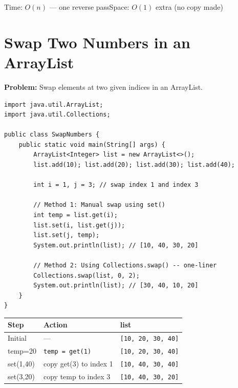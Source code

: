 \documentclass[12pt,a4paper,oneside]{book}
\begin{document}
\begin{complexity}
Time: $O(n)$ --- one reverse pass\quad Space: $O(1)$ extra (no copy made)
\end{complexity}

\section{Swap Two Numbers in an ArrayList}

\textbf{Problem:} Swap elements at two given indices in an ArrayList.

\begin{lstlisting}[caption={Swap Two Numbers in ArrayList}]
import java.util.ArrayList;
import java.util.Collections;

public class SwapNumbers {
    public static void main(String[] args) {
        ArrayList<Integer> list = new ArrayList<>();
        list.add(10); list.add(20); list.add(30); list.add(40);

        int i = 1, j = 3; // swap index 1 and index 3

        // Method 1: Manual swap using set()
        int temp = list.get(i);
        list.set(i, list.get(j));
        list.set(j, temp);
        System.out.println(list); // [10, 40, 30, 20]

        // Method 2: Using Collections.swap() -- one-liner
        Collections.swap(list, 0, 2);
        System.out.println(list); // [30, 40, 10, 20]
    }
}
\end{lstlisting}

\begin{dryrun}[list = {[10, 20, 30, 40]}, swap i=1, j=3]
\begin{center}
\begin{tabular}{lll}
\toprule
\textbf{Step} & \textbf{Action} & \textbf{list}\\
\midrule
Initial  & ---                       & \texttt{[10, 20, 30, 40]}\\
temp=20  & \texttt{temp = get(1)}    & \texttt{[10, 20, 30, 40]}\\
set(1,40)& copy get(3) to index 1   & \texttt{[10, 40, 30, 40]}\\
set(3,20)& copy temp to index 3     & \texttt{[10, 40, 30, 20]}\\
\bottomrule
\end{tabular}
\end{center}
\end{dryrun}
\end{document}
